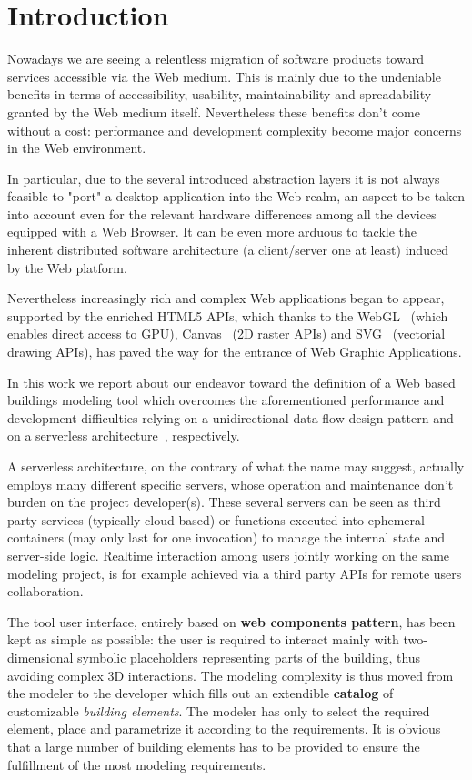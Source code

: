 \section{Introduction}

Nowadays we are seeing a relentless migration of software products toward services accessible via the Web medium. This is mainly due to the undeniable benefits in terms of accessibility, usability, maintainability and spreadability granted by the Web medium itself. Nevertheless these benefits don't come without a cost: performance  and development complexity become major concerns in the Web environment. 

In particular, due to the several introduced abstraction layers it is not always feasible to "port" a desktop application into the Web realm, an aspect to be taken into account even for the relevant hardware differences among all the devices equipped with a Web Browser. It can be even more arduous to tackle the inherent distributed software architecture (a client/server one at least) induced by the Web platform.

Nevertheless increasingly rich and complex Web applications began to appear, supported by the enriched HTML5 APIs, which thanks to the WebGL~\cite{webgl} (which enables direct access to GPU), Canvas~\cite{Munro:15:HCC} (2D raster APIs) and SVG~\cite{Jackson:11:SVG} (vectorial drawing APIs), has paved the way for the entrance of Web Graphic Applications.

In this work we report about our endeavor toward the definition of a Web based buildings modeling tool which overcomes the aforementioned performance and development difficulties relying on a unidirectional data flow design pattern and on a serverless architecture~\cite{Roberts}, respectively.

A serverless architecture, on the contrary of what the name may suggest, actually employs many different specific servers, whose operation and maintenance don't burden on the project developer(s). These several servers can be seen as third party services (typically cloud-based) or functions executed into ephemeral containers (may only last for one invocation) to manage the internal state and server-side logic. Realtime interaction among users jointly working on the same modeling project, is for example achieved via a third party APIs for remote users collaboration.

The tool user interface, entirely based on \textbf{web components pattern},  has been kept as simple as possible: the user is required to interact mainly with two-dimensional symbolic placeholders representing parts of the building, thus avoiding complex 3D interactions. 
The modeling complexity is thus moved from the modeler to the developer which fills out an extendible \textbf{catalog} of customizable \textit{building elements}. The modeler has only to select the required element, place and parametrize it according to the requirements. It is obvious that a large number of building elements has to be provided to ensure the fulfillment of the most modeling requirements.

